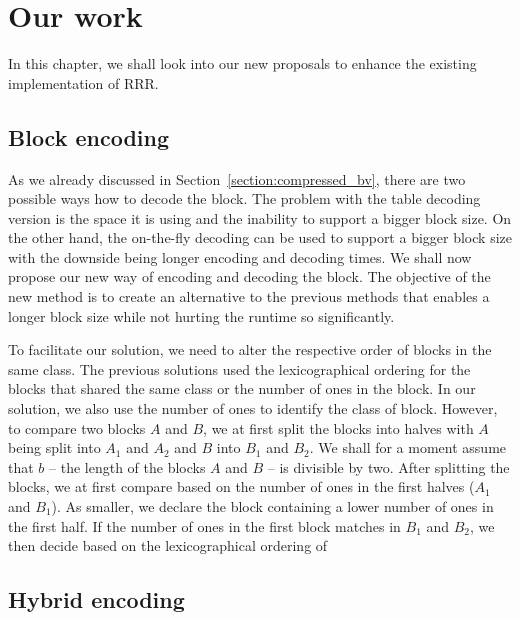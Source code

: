 \chapter{Our work}
\label{kap:kap3}

In this chapter, we shall look into our new proposals to enhance the existing implementation of RRR.

\section{Block encoding}

As we already discussed in Section~\ref{section:compressed_bv}, there are two possible ways how to
decode the block. The problem with the table decoding version is the space it is using and the inability to
support a bigger block size. On the other hand, the on-the-fly decoding can be used to support a bigger
block size with the downside being longer encoding and decoding times. We shall now propose our new
way of encoding and decoding the block. The objective of the new method is to create an alternative to
the previous methods that enables a longer block size while not hurting the runtime so significantly.

To facilitate our solution, we need to alter the respective order of blocks in the same class. The
previous solutions used the lexicographical ordering for the blocks that shared the same class or
the number of ones in the block. In our solution, we also use the number of ones to identify 
the class of block. However, to compare two blocks $A$ and $B$, we at first split the blocks into
halves with $A$ being split into $A_1$ and $A_2$ and $B$ into $B_1$ and $B_2$. We shall for a moment
assume that $b$ -- the length of the blocks $A$ and $B$ -- is divisible by two. After splitting the blocks,
we at first compare based on the number of ones in the first halves ($A_1$ and $B_1$). As smaller, we
declare the block containing a lower number of ones in the first half. If the number of ones in the first
block matches in $B_1$ and $B_2$, we then decide based on the lexicographical ordering of   

\section{Hybrid encoding}
